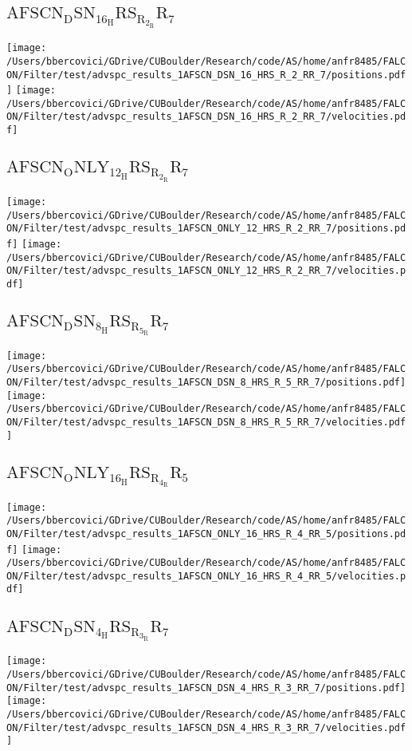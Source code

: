 \subsection{$\mathrm{AFSCN_DSN_16_HRS_R_2_RR_7}$}
\texttt{[image: /Users/bbercovici/GDrive/CUBoulder/Research/code/AS/home/anfr8485/FALCON/Filter/test/advspc\_results\_1AFSCN\_DSN\_16\_HRS\_R\_2\_RR\_7/positions.pdf]}
\texttt{[image: /Users/bbercovici/GDrive/CUBoulder/Research/code/AS/home/anfr8485/FALCON/Filter/test/advspc\_results\_1AFSCN\_DSN\_16\_HRS\_R\_2\_RR\_7/velocities.pdf]}
\subsection{$\mathrm{AFSCN_ONLY_12_HRS_R_2_RR_7}$}
\texttt{[image: /Users/bbercovici/GDrive/CUBoulder/Research/code/AS/home/anfr8485/FALCON/Filter/test/advspc\_results\_1AFSCN\_ONLY\_12\_HRS\_R\_2\_RR\_7/positions.pdf]}
\texttt{[image: /Users/bbercovici/GDrive/CUBoulder/Research/code/AS/home/anfr8485/FALCON/Filter/test/advspc\_results\_1AFSCN\_ONLY\_12\_HRS\_R\_2\_RR\_7/velocities.pdf]}
\subsection{$\mathrm{AFSCN_DSN_8_HRS_R_5_RR_7}$}
\texttt{[image: /Users/bbercovici/GDrive/CUBoulder/Research/code/AS/home/anfr8485/FALCON/Filter/test/advspc\_results\_1AFSCN\_DSN\_8\_HRS\_R\_5\_RR\_7/positions.pdf]}
\texttt{[image: /Users/bbercovici/GDrive/CUBoulder/Research/code/AS/home/anfr8485/FALCON/Filter/test/advspc\_results\_1AFSCN\_DSN\_8\_HRS\_R\_5\_RR\_7/velocities.pdf]}
\subsection{$\mathrm{AFSCN_ONLY_16_HRS_R_4_RR_5}$}
\texttt{[image: /Users/bbercovici/GDrive/CUBoulder/Research/code/AS/home/anfr8485/FALCON/Filter/test/advspc\_results\_1AFSCN\_ONLY\_16\_HRS\_R\_4\_RR\_5/positions.pdf]}
\texttt{[image: /Users/bbercovici/GDrive/CUBoulder/Research/code/AS/home/anfr8485/FALCON/Filter/test/advspc\_results\_1AFSCN\_ONLY\_16\_HRS\_R\_4\_RR\_5/velocities.pdf]}
\subsection{$\mathrm{AFSCN_DSN_4_HRS_R_3_RR_7}$}
\texttt{[image: /Users/bbercovici/GDrive/CUBoulder/Research/code/AS/home/anfr8485/FALCON/Filter/test/advspc\_results\_1AFSCN\_DSN\_4\_HRS\_R\_3\_RR\_7/positions.pdf]}
\texttt{[image: /Users/bbercovici/GDrive/CUBoulder/Research/code/AS/home/anfr8485/FALCON/Filter/test/advspc\_results\_1AFSCN\_DSN\_4\_HRS\_R\_3\_RR\_7/velocities.pdf]}
